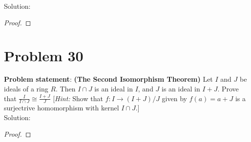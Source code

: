 \documentclass{article} %
\begin{document}
Solution: 
\begin{addmargin}[1em]{0em}
\begin{proof}

\end{proof}
\end{addmargin}

\newpage

\section*{Problem 30}


\textbf{Problem statement}: \textbf{(The Second Isomorphism Theorem)} Let $I$ and $J$ be ideals of a ring $R$.  Then $I \cap J$ is an ideal in $I$, and $J$ is an ideal in $I + J$.  Prove that $\frac{I}{I \cap J} \cong \frac{I + J}{J}$ [\textit{Hint: } Show that $f: I \rightarrow (I + J)/J$ given by $f(a) = a + J$ is a surjectrive homomorphism with kernel $I \cap J$.]
\\

Solution: 
\begin{addmargin}[1em]{0em}
\begin{proof}

\end{proof}
\end{addmargin}

\newpage
\end{document}
